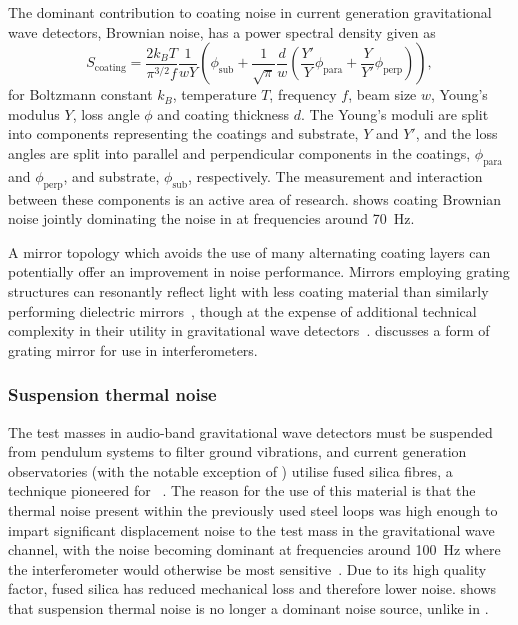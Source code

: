 The dominant contribution to coating noise in current generation gravitational wave detectors, Brownian noise, has a power spectral density given as~\cite{Harry2002}
\begin{equation}
  \label{eq:coating-brownian-psd}
  S_{\text{coating}} = \frac{2 k_B T}{\pi^{3/2} f} \frac{1}{w Y} \left( \phi_{\text{sub}} + \frac{1}{\sqrt{\pi}} \frac{d}{w} \left( \frac{Y'}{Y} \phi_{\text{para}} + \frac{Y}{Y'} \phi_{\text{perp}} \right) \right),
\end{equation}
for Boltzmann constant $k_B$, temperature $T$, frequency $f$, beam size $w$, Young's modulus $Y$, loss angle $\phi$ and coating thickness $d$. The Young's moduli are split into components representing the coatings and substrate, $Y$ and $Y'$, and the loss angles are split into parallel and perpendicular components in the coatings, $\phi_{\text{para}}$ and $\phi_{\text{perp}}$, and substrate, $\phi_{\text{sub}}$, respectively. The measurement and interaction between these components is an active area of research.  shows coating Brownian noise jointly dominating the noise in \ALIGO{} at frequencies around \SI{70}{\hertz}.

A mirror topology which avoids the use of many alternating coating layers can potentially offer an improvement in noise performance. Mirrors employing grating structures can resonantly reflect light with less coating material than similarly performing dielectric mirrors~\cite{Mashev1985}, though at the expense of additional technical complexity in their utility in gravitational wave detectors~\cite{Leavey2015}.  discusses a form of grating mirror for use in interferometers.

\subsubsection{\label{sec:sus-thermal-noise}Suspension thermal noise}
The test masses in audio-band gravitational wave detectors must be suspended from pendulum systems to filter ground vibrations, and current generation observatories (with the notable exception of \KAGRA{}) utilise fused silica fibres, a technique pioneered for \GEO{}~\cite{Barr2002}. The reason for the use of this material is that the thermal noise present within the previously used steel loops was high enough to impart significant displacement noise to the test mass in the gravitational wave channel, with the noise becoming dominant at frequencies around \SI{100}{\hertz} where the interferometer would otherwise be most sensitive~\cite{Hammond2012}. Due to its high quality factor, fused silica has reduced mechanical loss and therefore lower noise.  shows that suspension thermal noise is no longer a dominant noise source, unlike in \ILIGO{}.

